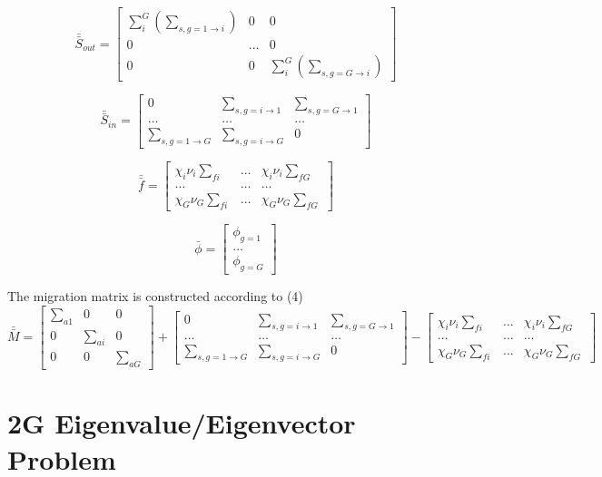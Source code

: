 \documentclass[11pt, oneside]{article}   	%
\begin{document}
$$\bar{\bar{S}}_{out}  = \begin{bmatrix}
\sum_{i}^{G}(\sum_{s,g=1\rightarrow i} )  & 0 & 0\\ 
 0& \dots &0 \\ 
0 & 0 & \sum_{i}^{G}(\sum_{s,g=G\rightarrow i} )
\end{bmatrix} $$

$$\bar{\bar{S}}_{in}  = \begin{bmatrix}
0&\sum_{s,g=i\rightarrow 1} & \sum_{s,g=G\rightarrow 1} \\ 
 \dots& \dots & \dots \\ 
\sum_{s,g=1\rightarrow G}  & \sum_{s,g=i\rightarrow G}  & 0 
\end{bmatrix} $$

$$\bar{\bar{f}}  = \begin{bmatrix}
\chi_{i} \nu_{i} \sum_{fi}&\dots & \chi_{i} \nu_{i} \sum_{fG} \\ 
 \dots& \dots & \dots \\ 
\chi_{G} \nu_{G} \sum_{fi}  & \dots & \chi_{G} \nu_{G} \sum_{fG} 
\end{bmatrix} $$

$$\bar{\phi }  = \begin{bmatrix}
\phi _{g=1}  \\ 
 \dots \\ 
\phi _{g=G} 
\end{bmatrix} $$

The migration matrix is constructed according to (4)
$$\bar{\bar{M}} = \begin{bmatrix}
 \sum _{a1} & 0 & 0\\ 
 0 & \sum _{ai} &  0 \\ 
 0  & 0 &  \sum _{aG}
\end{bmatrix} + \begin{bmatrix}
0&\sum_{s,g=i\rightarrow 1} & \sum_{s,g=G\rightarrow 1} \\ 
 \dots& \dots & \dots \\ 
\sum_{s,g=1\rightarrow G}  & \sum_{s,g=i\rightarrow G}  & 0 
\end{bmatrix} -  \begin{bmatrix}
\chi_{i} \nu_{i} \sum_{fi}&\dots & \chi_{i} \nu_{i} \sum_{fG} \\ 
 \dots& \dots & \dots \\ 
\chi_{G} \nu_{G} \sum_{fi}  & \dots & \chi_{G} \nu_{G} \sum_{fG} 
\end{bmatrix}$$

\newpage
\section{2G Eigenvalue/Eigenvector Problem}
\end{document}

